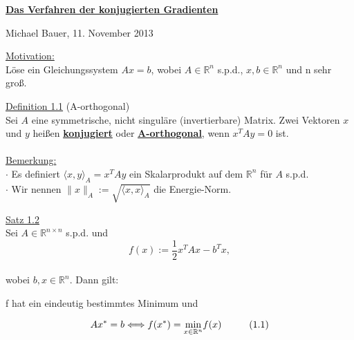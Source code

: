 \documentclass[a4paper]{letter}
\begin{document}
\begin{center}
	\underline{
		\textbf{
			\large{
				Das Verfahren der konjugierten Gradienten
			}
		}
	}
\end{center}

\begin{center}
Michael Bauer, 11. November 2013
\end{center}

\parskip 5pt

\underline{Motivation:}
\\L\"ose ein Gleichungssystem $Ax = b$, wobei $A\in\mathbb{R}^{n}$ s.p.d., $x, b\in\mathbb{R}^{n}$ und n sehr gro{\ss}.

\parskip 12pt

\underline{Definition 1.1} (A-orthogonal)
\\Sei $A$ eine symmetrische, nicht singul\"are (invertierbare) Matrix. Zwei Vektoren $x$ und $y$ hei{\ss}en \underline{\textbf{konjugiert}} oder \underline{\textbf{A-orthogonal}},
wenn $x^{T}Ay = 0$ ist.
\\\\\underline{Bemerkung:}
\\$\cdot$ Es definiert $\langle x,y \rangle _{A} = x^{T}Ay$ ein Skalarprodukt auf dem $\mathbb{R}^{n}$ f\"ur $A$ s.p.d.
\\$\cdot$ Wir nennen $\|x\|_{A} := \sqrt{\langle x, x \rangle _{A}}$ die Energie-Norm.

\underline{Satz 1.2}
\\Sei $A\in\mathbb{R}^{n \times n}$ s.p.d. und
$$f(x) := \frac 1 2 x^{T}Ax - b^{T}x,$$
\\wobei $b,x \in \mathbb{R}^{n}$. Dann gilt:
\begin{center}
f hat ein eindeutig bestimmtes Minimum und
\end{center}
$$Ax^{*} = b \Longleftrightarrow f(x^{*}) = \underset{x\in\mathbb{R}^{n}}{\min} f(x) \hspace{10mm}(1.1)$$
\end{document}
